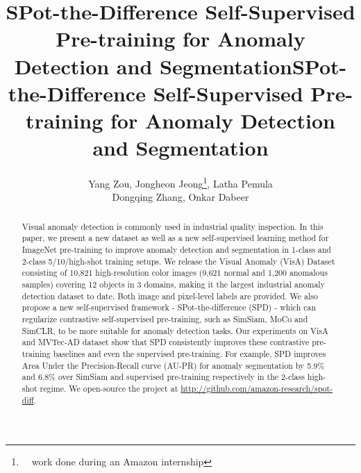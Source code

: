 \title{SPot-the-Difference Self-Supervised Pre-training for Anomaly Detection and Segmentation}



\pagestyle{headings}
\mainmatter
\def\ECCVSubNumber{2149}  

\title{SPot-the-Difference Self-Supervised Pre-training for Anomaly Detection and Segmentation}

\author{Yang Zou, Jongheon Jeong\thanks{~~work done during an Amazon internship}, Latha Pemula \\Dongqing Zhang, Onkar Dabeer}
\maketitle

\begin{abstract}
 Visual anomaly detection is commonly used in industrial quality inspection. In this paper, we present a new dataset as well as a new self-supervised learning method for ImageNet pre-training to improve anomaly detection and segmentation in 1-class and 2-class 5/10/high-shot training setups. We release the Visual Anomaly (VisA) Dataset consisting of 10,821 high-resolution color images (9,621 normal and 1,200 anomalous samples) covering 12 objects in 3 domains, making it the largest industrial anomaly detection dataset to date. Both image and pixel-level labels are provided. We also propose a new self-supervised framework - SPot-the-difference (SPD) - which can regularize contrastive self-supervised pre-training, such as SimSiam, MoCo and SimCLR, to be more suitable for anomaly detection tasks. Our experiments on VisA and MVTec-AD dataset show that SPD consistently improves these contrastive pre-training baselines and even the supervised pre-training. For example, SPD improves Area Under the Precision-Recall curve (AU-PR) for anomaly segmentation by 5.9\% and 6.8\% over SimSiam and supervised pre-training respectively in the 2-class high-shot regime.
 We open-source the project at \url{http://github.com/amazon-research/spot-diff}.

\end{abstract}

